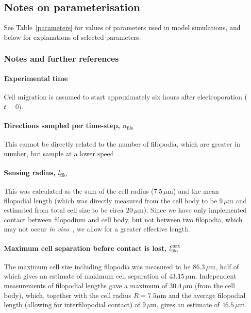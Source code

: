 \documentclass[review]{elsarticle}
\begin{document}
    \subsection{Notes on parameterisation\label{parameterisation}}
    See Table~\ref{parameters} for values of parameters used in model simulations, and below for explanations of selected parameters.
        	
    	\subsubsection{Notes and further references\label{parameterNotes}}
    	\paragraph{Experimental time} Cell migration is assumed to start approximately six hours after electroporation ($t=0$).
            
            \paragraph{Directions sampled per time-step, $n_\mathrm{filo}$} This cannot be directly related to the number of filopodia, which are greater in number, but sample at a lower speed~\cite{McLennan2012}.
            
            \paragraph{Sensing radius, $l_\mathrm{filo}$} This was calculated as the sum of the cell radius ($7.5\,\mu$m) and the mean filopodial length (which was directly measured from the cell body to be $9\,\mu$m and estimated from total cell size to be circa $20\,\mu$m). Since we have only implemented contact between filopodium and cell body, but not between two filopodia, which may not occur \textsl{in vivo}~\cite{Teddy2004}, we allow for a greater effective length.
            
            \paragraph{Maximum cell separation before contact is lost, $l^\mathrm{max}_\mathrm{filo}$} The maximum cell size including filopodia was measured to be $86.3\,\mu$m, half of which gives an estimate of maximum cell separation of $43.15\,\mu$m. Independent measurements of filopodial lengths gave a maximum of $30.4\,\mu$m (from the cell body), which, together with the cell radius $R = 7.5\mu$m and the average filopodial length (allowing for interfilopodial contact) of $9\,\mu$m, gives an estimate of $46.5\,\mu$m.
    
\end{document}
